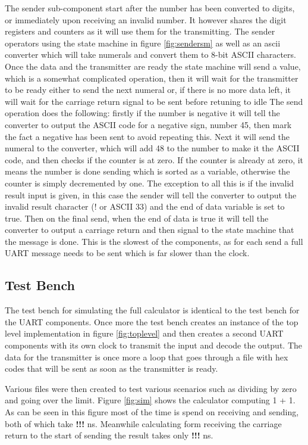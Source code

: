 \documentclass[11pt]{article}
\begin{document}
The sender sub-component start after the number has been converted to digits, or immediately upon receiving an invalid number. 
It however shares the digit registers and counters as it will use them for the transmitting.
The sender operators using the state machine in figure \ref{fig:sendersm} as well as an ascii converter which will take numerals and convert them to 8-bit ASCII characters.
Once the data and the transmitter are ready the state machine will send a value, which is a somewhat complicated operation,
then it will wait for the transmitter to be ready either to send the next numeral or, if there is no more data left, it will wait for the carriage return signal to be sent before retuning to idle
The send operation does the following: firstly if the number is negative it will tell the converter to output the ASCII code for a negative sign, number 45, then mark the fact a negative has been sent to avoid repeating this.
Next it will send the numeral to the converter, which will add 48 to the number to make it the ASCII code, and then checks if the counter is at zero.
If the counter is already at zero, it means the number is done sending which is sorted as a variable, otherwise the counter is simply decremented by one.
The exception to all this is if the invalid result input is given, in this case the sender will tell the converter to output the invalid result character (! or ASCII 33) and the end of data variable is set to true.
Then on the final send, when the end of data is true it will tell the converter to output a carriage return and then signal to the state machine that the message is done.
This is the slowest of the components, as for each send a full UART message needs to be sent which is far slower than the clock.

\subsection{Test Bench}

The test bench for simulating the full calculator is identical to the test bench for the UART components.
Once more the test bench creates an instance of the top level implementation in figure \ref{fig:toplevel}
and then creates a second UART components with its own clock to transmit the input and decode the output.
The data for the transmitter is once more a loop that goes through a file with hex codes that will be sent as soon as the transmitter is ready.

Various files were then created to test various scenarios such as dividing by zero and going over the limit.
Figure \ref{fig:sim} shows the calculator computing 1 + 1.
As can be seen in this figure most of the time is spend on receiving and sending, both of which take \textbf{!!!} ns.
Meanwhile calculating form receiving the carriage return to the start of sending the result takes only \textbf{!!!} ns.
\end{document}
